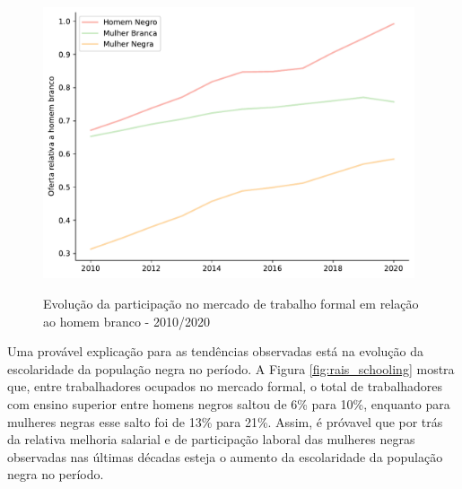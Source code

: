 \documentclass[12pt]{article}
\begin{document}
\begin{figure}[H]
    \centering
    \caption{Evolução da participação no mercado de trabalho formal em relação ao homem branco - 2010/2020}
        \includegraphics[height=8cm]{../figures/supply_gap.pdf}
    \label{fig:supply_gap}
\end{figure}

\par Uma provável explicação para as tendências observadas está na evolução da escolaridade da população negra no período. A Figura \ref{fig:rais_schooling} mostra que, entre trabalhadores ocupados no mercado formal, o total de trabalhadores com ensino superior entre homens negros saltou de 6\% para 10\%, enquanto para mulheres negras esse salto foi de 13\% para 21\%. Assim, é próvavel que por trás da relativa melhoria salarial e de participação laboral das mulheres negras observadas nas últimas décadas esteja o aumento da escolaridade da população negra no período.

% 
% 
\end{document}
